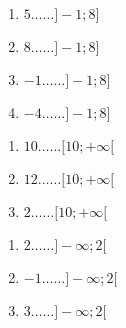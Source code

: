 \documentclass[a4paper,dvipsnames]{article}
\begin{document}
\begin{multicols}{4}
  \begin{enumerate}
    \item [] $5\hdots\hdots]-1;8]$\columnbreak
    \item [] $8\hdots\hdots]-1;8]$\columnbreak
    \item [] $-1\hdots\hdots]-1;8]$\columnbreak
    \item [] $-4\hdots\hdots]-1;8]$
  \end{enumerate}
\end{multicols}

\begin{multicols}{4}
  \begin{enumerate}
    \item [] $10\hdots\hdots[10;+\infty[$\columnbreak
    \item [] $12\hdots\hdots[10;+\infty[$\columnbreak
    \item [] $2\hdots\hdots[10;+\infty[$
  \end{enumerate}
\end{multicols}

\begin{multicols}{4}
  \begin{enumerate}
    \item [] $2\hdots\hdots]-\infty;2[$\columnbreak
    \item [] $-1\hdots\hdots]-\infty;2[$\columnbreak
    \item [] $3\hdots\hdots]-\infty;2[$
  \end{enumerate}
\end{multicols}

\bigskip
\end{document}
